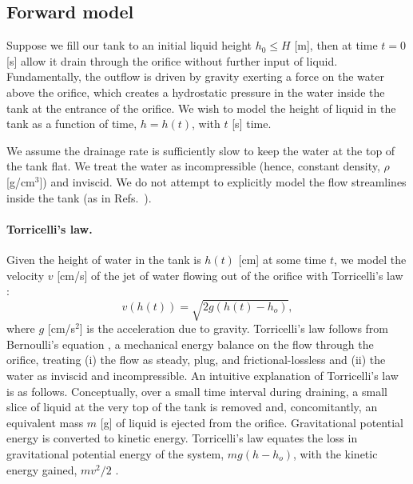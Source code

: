 \documentclass[openacc]{rsproca_new}%
\begin{document}
\subsection{Forward model}
Suppose we fill our tank to an initial liquid height $h_0 \leq H$ [m], then at time $t=0$ [s] allow it drain through the orifice without further input of liquid. Fundamentally, the outflow is driven by gravity exerting a force on the water above the orifice, which creates a hydrostatic pressure in the water inside the tank at the entrance of the orifice. 
We wish to model the height of liquid in the tank as a function of time, $h=h(t)$, with $t$ [s] time. 

We assume the drainage rate is sufficiently slow to keep the water at the top of the tank flat. We treat the water as incompressible (hence, constant density, $\rho$ [g/cm$^3$]) and inviscid. We do not attempt to explicitly model the flow streamlines inside the tank (as in Refs.~\cite{mathew2014numerical,sakri2017numerical}). 

\paragraph{Torricelli's law.}
Given the height of water in the tank is $h(t)$ [cm] at some time $t$, we model the velocity $v$ [cm/s] of the jet of water flowing out of the orifice with Torricelli's law \cite{d2021torricelli}:
\begin{equation}
	v\left(h(t) \right)=  \sqrt{2 g(h(t)-h_o)}, \label{eq:Torricelli}
\end{equation} where $g$ [cm/s$^2$] is the acceleration due to gravity. Torricelli's law follows from Bernoulli's equation \cite{welty2020fundamentals}, a mechanical energy balance on the flow through the orifice, treating (i) the flow as steady, plug, and frictional-lossless and (ii) the water as inviscid and incompressible.
An intuitive explanation of Torricelli's law is as follows. 
Conceptually, over a small time interval during draining, a small slice of liquid at the very top of the tank is removed and, concomitantly, an equivalent mass $m$ [g] of liquid is ejected from the orifice. Gravitational potential energy is converted to kinetic energy. 
Torricelli's law equates the loss in gravitational potential energy of the system, $m g(h-h_o)$, with the kinetic energy gained, $m v^2/2$ \cite{groetsch1993inverse,driver1998torricelli,williams2021vessel}. 
\end{document}
